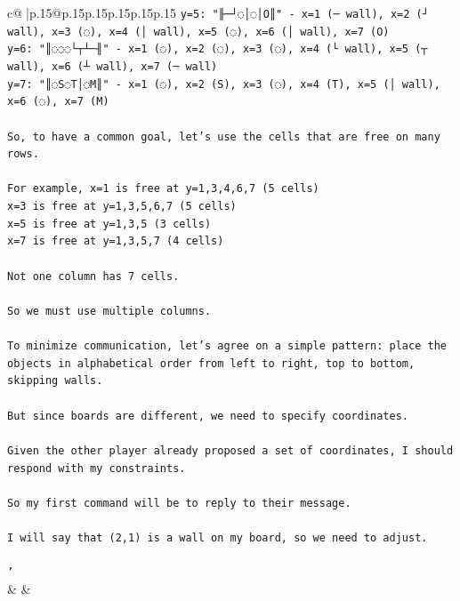 \documentclass{article}
\begin{document}
{\begin{supertabular}{c@{$\;$}|p{.15\linewidth}@{}p{.15\linewidth}p{.15\linewidth}p{.15\linewidth}p{.15\linewidth}p{.15\linewidth}}
{{{\texttt{y=5: "╟─┘◌│◌│O║" {-} x=1 (─ wall), x=2 (┘ wall), x=3 (◌), x=4 (│ wall), x=5 (◌), x=6 (│ wall), x=7 (O)} \\
\texttt{y=6: "║◌◌◌└┬┴─╢" {-} x=1 (◌), x=2 (◌), x=3 (◌), x=4 (└ wall), x=5 (┬ wall), x=6 (┴ wall), x=7 (─ wall)} \\
\texttt{y=7: "║◌S◌T│◌M║" {-} x=1 (◌), x=2 (S), x=3 (◌), x=4 (T), x=5 (│ wall), x=6 (◌), x=7 (M)} \\
\\ 
\texttt{So, to have a common goal, let's use the cells that are free on many rows.} \\
\\ 
\texttt{For example, x=1 is free at y=1,3,4,6,7 (5 cells)} \\
\texttt{x=3 is free at y=1,3,5,6,7 (5 cells)} \\
\texttt{x=5 is free at y=1,3,5 (3 cells)} \\
\texttt{x=7 is free at y=1,3,5,7 (4 cells)} \\
\\ 
\texttt{Not one column has 7 cells.} \\
\\ 
\texttt{So we must use multiple columns.} \\
\\ 
\texttt{To minimize communication, let's agree on a simple pattern: place the objects in alphabetical order from left to right, top to bottom, skipping walls.} \\
\\ 
\texttt{But since boards are different, we need to specify coordinates.} \\
\\ 
\texttt{Given the other player already proposed a set of coordinates, I should respond with my constraints.} \\
\\ 
\texttt{So my first command will be to reply to their message.} \\
\\ 
\texttt{I will say that (2,1) is a wall on my board, so we need to adjust.} \\
\\ 
\texttt{'} \\
            }
        }
    }
    & & \\ \\


\end{supertabular}}
\end{document}
